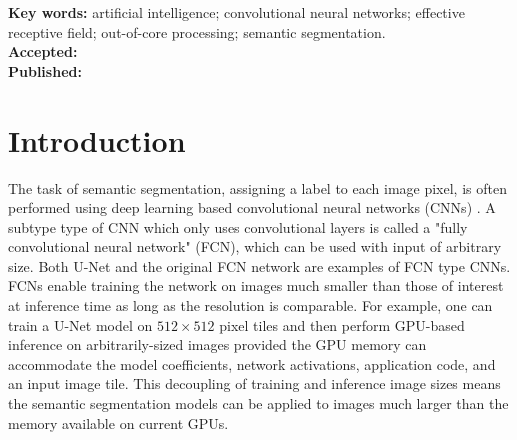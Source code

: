 \documentclass[10pt, indentfirst]{article}
\renewcommand{\headrulewidth}{.5pt}
\renewcommand{\footrulewidth}{0pt}
\begin{document}
\begin{flushleft}
	
	
	\vspace{8pt} 
	\textbf{Key words:} artificial intelligence; convolutional neural networks; effective receptive field; out-of-core processing; semantic segmentation. \\ %
	\vspace{8pt} 
	\textbf{Accepted:} \accepted \\
	\vspace{8pt} 
	\textbf{Published:} \published \\ %
	\vspace{8pt} 
	\DOI
\end{flushleft}
\vspace{-15pt}
\LARGE \hrulefill

\setlength{\abovedisplayskip}{19pt}
\setlength{\belowdisplayskip}{19pt}
\setlength{\abovedisplayshortskip}{9pt}
\setlength{\belowdisplayshortskip}{19pt}

\raggedright
\setlength\parindent{16pt}

\pagestyle{fancy}
\renewcommand{\headrulewidth}{.5pt}
  \renewcommand{\footrulewidth}{0pt}
  \fancyhead{}


\fancyfoot{} 
\fancyfoot[c]{\thepage}
\fancyfoot[r]{\DOI}



\section{Introduction}


\normalsize

The task of semantic segmentation, assigning a label to each image pixel, is often performed using deep learning based convolutional neural networks (CNNs) \citep{Badrinarayanan2015a,Ronneberger2015a}. A subtype type of CNN which only uses convolutional layers is called a "fully convolutional neural network" (FCN), which can be used with input of arbitrary size. Both U-Net \citep{Ronneberger2015a} and the original FCN network \citep{Long2015} are examples of FCN type CNNs. 
FCNs enable training the network on images much smaller than those of interest at inference time as long as the resolution is comparable. 
For example, one can train a U-Net model on $512 \times 512$ pixel tiles and then perform GPU-based inference on arbitrarily-sized images provided the GPU memory can accommodate the model coefficients, network activations, application code, and an input image tile. This decoupling of training and inference image sizes means the semantic segmentation models can be applied to images much larger than the memory available on current GPUs. 
\end{document}
